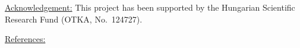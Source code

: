 \documentclass{article}
\begin{document}

\vspace{1em}
\noindent\underline{Acknowledgement:}\vspace{0.2em}\newline
This project has been supported by the Hungarian Scientific Research Fund (OTKA, No.~124727).

\vspace{1em}
\noindent\underline{References:}\vspace{-1.9em}\newline
\renewcommand{\section}[2]{}
\end{document}
